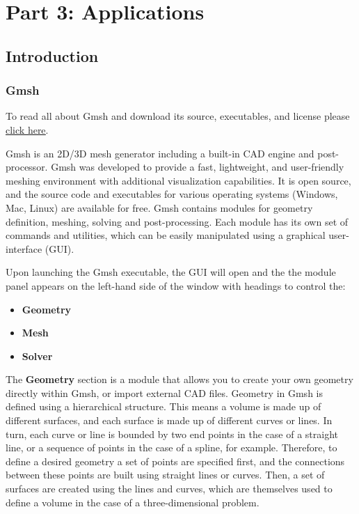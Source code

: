 \part{Part 3: Applications}

\graphicspath{ {./Pictures/} }

\chapter{Introduction}
\label{ch:intro for tutorials}
\section{Gmsh}
\begin{gmshnote}
	To read all about Gmsh and download its source, executables, and license please \href{http://gmsh.info}{\underline{click here}}.
\end{gmshnote}
Gmsh is an 2D/3D mesh generator including a built-in CAD engine and post-processor. Gmsh was developed to provide a fast, lightweight, and user-friendly meshing environment with additional visualization capabilities. It is open source, and the source code and executables for various operating systems (Windows, Mac, Linux) are available for free. Gmsh contains modules for geometry definition, meshing, solving and post-processing. Each module has its own set of commands and utilities, which can be easily manipulated using a graphical user-interface (GUI).

Upon launching the Gmsh executable, the GUI will open and the the module panel appears on the left-hand side of the window with headings to control the:
\begin{itemize}
    \item \textbf{Geometry}
    \item \textbf{Mesh}
    \item \textbf{Solver}
\end{itemize}
The \textbf{Geometry} section is a module that allows you to create your own geometry directly within Gmsh, or import external CAD files. Geometry in Gmsh is defined using a hierarchical structure. This means a volume is made up of different surfaces, and each surface is made up of different curves or lines. In turn, each curve or line is bounded by two end points in the case of a straight line, or a sequence of points in the case of a spline, for example. Therefore, to define a desired geometry a set of points are specified first, and the connections between these points are built using straight lines or curves. Then, a set of surfaces are created using the lines and curves, which are themselves used to define a volume in the case of a three-dimensional problem.

